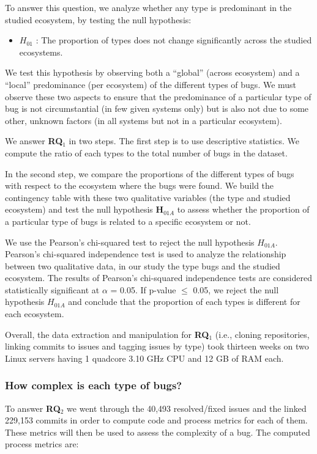 To answer this question, we analyze whether any type is predominant in the studied ecosystem, by testing the null hypothesis:

\begin{itemize}
	\item $H_{01}$ : The proportion of types does not
change significantly across the studied ecosystems.
\end{itemize}

We test this hypothesis by observing both a ``global'' (across ecosystem) and a ``local'' predominance (per ecosystem) of the different types of bugs.
We must observe these two aspects to ensure that the predominance of a particular type of bug is not circumstantial (in few given systems only) but is also not due to some other, unknown factors (in all systems but not in a particular ecosystem).

We answer {\bf RQ$_1$} in two steps.
The first step is to use descriptive statistics. We compute the ratio of each types to the total number of bugs in the dataset.

In the second step, we compare the proportions of the different types of bugs with respect to the ecosystem where the bugs were found.
We build the contingency table with these two qualitative variables (the type and studied ecosystem) and test the null hypothesis {\bf H$_{01A}$} to assess whether the proportion of a particular type of bugs is related to a specific ecosystem or not.

We use the Pearson's chi-squared test to reject the null hypothesis $H_{01A}$.
Pearson's chi-squared independence test is used to analyze the relationship between two qualitative data, in our study the type bugs and the studied ecosystem.
The results of Pearson's chi-squared independence tests are considered
statistically significant at $\alpha$ = 0.05.
If p-value $\le$ 0.05, we reject the null hypothesis $H_{01A}$ and conclude that the proportion of each types is different for each ecosystem.

Overall, the data extraction and manipulation for {\bf RQ$_1$} (i.e., cloning repositories, linking commits to issues and tagging issues by type) took thirteen weeks on two Linux servers having 1 quadcore
3.10 GHz CPU and 12 GB of RAM each.

\subsubsection{How complex is each type of bugs?}  To answer {\bf RQ$_2$} we went through the 40,493 resolved/fixed issues and the linked 229,153 commits in order to compute code and process metrics for each of them.
These metrics will then be used to assess the complexity of a bug.
The computed process metrics are:

